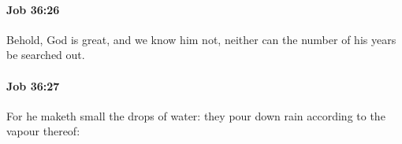 		\paragraph{Job 36:26} %
			\label{JOB-36-26}

			Behold, God is great, and we know him not, neither can the number of his years be searched out.


		\paragraph{Job 36:27} %
			\label{JOB-36-27}

			For he maketh small the drops of water: they pour down rain according to the vapour thereof:


